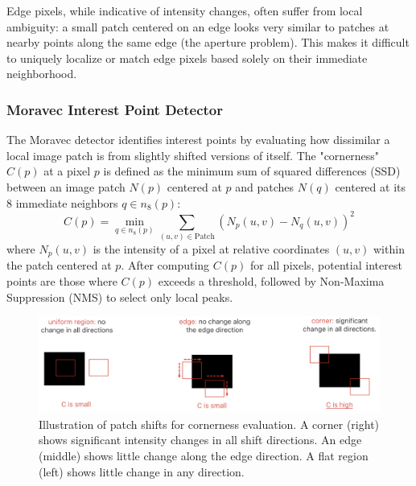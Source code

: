 Edge pixels, while indicative of intensity changes, often suffer from local ambiguity: a small patch centered on an edge looks very similar to patches at nearby points along the same edge (the aperture problem). This makes it difficult to uniquely localize or match edge pixels based solely on their immediate neighborhood.

\subsubsection{Moravec Interest Point Detector}
The Moravec detector identifies interest points by evaluating how dissimilar a local image patch is from slightly shifted versions of itself. The "cornerness" $C(p)$ at a pixel $p$ is defined as the minimum sum of squared differences (SSD) between an image patch $N(p)$ centered at $p$ and patches $N(q)$ centered at its 8 immediate neighbors $q \in n_8(p)$:
\[ C(p) = \min_{q \in n_8(p)} \sum_{(u,v) \in \text{Patch}} (N_p(u,v) - N_q(u,v))^2 \]
where $N_p(u,v)$ is the intensity of a pixel at relative coordinates $(u,v)$ within the patch centered at $p$.
After computing $C(p)$ for all pixels, potential interest points are those where $C(p)$ exceeds a threshold, followed by Non-Maxima Suppression (NMS) to select only local peaks.

\begin{figure}[htbp]
  \centering
  \includegraphics[width=0.9\linewidth]{./img/cornerness.jpg}
  \caption{Illustration of patch shifts for cornerness evaluation. A corner (right) shows significant intensity changes in all shift directions. An edge (middle) shows little change along the edge direction. A flat region (left) shows little change in any direction.}
  \label{fig:cornerness}
\end{figure}

